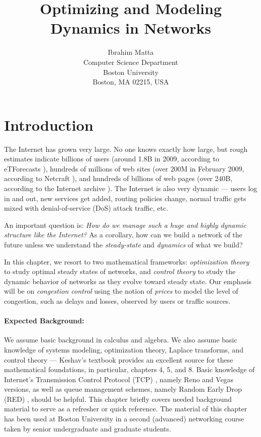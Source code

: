 \documentclass{article}
\title{Optimizing and Modeling Dynamics in Networks}
\author{{\sc Ibrahim Matta} \\
Computer Science Department \\
Boston University \\
Boston, MA 02215, USA}
\date{}							%
\begin{document}
\copyrightstatement

\pagestyle{empty}

\maketitle

\thispagestyle{empty}


\section{Introduction}

The Internet has grown very large. No one knows exactly how large, but rough estimates indicate billions of users (around 1.8B in 2009, according to eTForecasts \cite{eTForecasts}), hundreds of millions of web sites (over 200M in February 2009, according to Netcraft \cite{Netcraft}), and hundreds of billions of web pages (over 240B, according to the Internet archive \cite{Internet-archive}).
The Internet is also very dynamic --- users log in and out, new services get added, routing policies change, normal traffic gets mixed with denial-of-service (DoS) attack traffic, etc.

An important question is: {\em How do we manage such a huge and highly dynamic structure like the Internet?}
As a corollary, how can we build a network of the future unless we understand the {\em steady-state} and {\em dynamics} of what we build?

In this chapter, we resort to two mathematical frameworks: {\em optimization theory} to study optimal steady states of networks, and {\em control theory} to study the dynamic behavior of networks as they evolve toward steady state. Our emphasis will be on {\em congestion control} using the notion of {\em prices} to model the level of congestion, such as delays and losses, observed by users or traffic sources.

\paragraph{Expected Background:} We assume basic background in calculus and algebra.
We also assume basic knowledge of systems modeling, optimization theory, Laplace transforms, and control theory --- Keshav's textbook \cite{Keshav:2010} provides an excellent source for these mathematical foundations,
in particular, chapters 4, 5, and 8.
Basic knowledge of Internet's Transmission Control Protocol (TCP) \cite{tcp:1988},
namely Reno and Vegas \cite{vegas:1995} versions,
as well as queue management schemes, namely Random Early Drop (RED) \cite{red:1993},
should be helpful.
This chapter briefly covers needed background material to serve as a refresher or quick reference.
The material of this chapter has been used at Boston University in a second (advanced) networking course
taken by senior undergraduate and graduate students.
\end{document}

